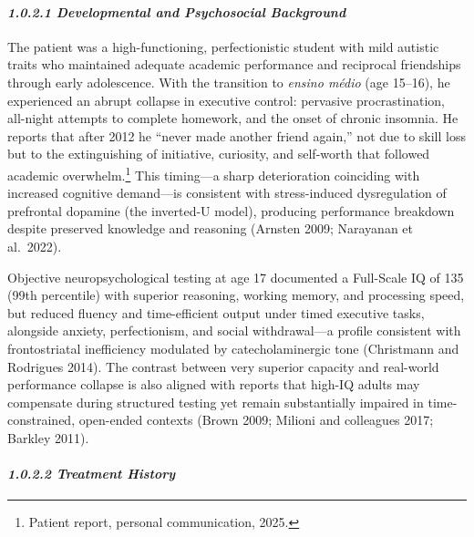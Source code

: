 \paragraph{\texorpdfstring{\emph{1.0.2.1 Developmental and Psychosocial Background}}{1.0.2.1 Developmental and Psychosocial Background}}\label{10b_traad-developmental-and-psychosocial-background}

The patient was a high-functioning, perfectionistic student with mild autistic traits who maintained adequate academic performance and reciprocal friendships through early adolescence. With the transition to \emph{ensino médio} (age 15--16), he experienced an abrupt collapse in executive control: pervasive procrastination, all-night attempts to complete homework, and the onset of chronic insomnia. He reports that after 2012 he ``never made another friend again,'' not due to skill loss but to the extinguishing of initiative, curiosity, and self-worth that followed academic overwhelm.\footnote{Patient report, personal communication, 2025.} This timing---a sharp deterioration coinciding with increased cognitive demand---is consistent with stress-induced dysregulation of prefrontal dopamine (the inverted-U model), producing performance breakdown despite preserved knowledge and reasoning (Arnsten 2009; Narayanan et al.~2022).

Objective neuropsychological testing at age 17 documented a Full-Scale IQ of 135 (99th percentile) with superior reasoning, working memory, and processing speed, but reduced fluency and time-efficient output under timed executive tasks, alongside anxiety, perfectionism, and social withdrawal---a profile consistent with frontostriatal inefficiency modulated by catecholaminergic tone (Christmann and Rodrigues 2014). The contrast between very superior capacity and real-world performance collapse is also aligned with reports that high-IQ adults may compensate during structured testing yet remain substantially impaired in time-constrained, open-ended contexts (Brown 2009; Milioni and colleagues 2017; Barkley 2011).

\paragraph{\texorpdfstring{\emph{1.0.2.2 Treatment History}}{1.0.2.2 Treatment History}}\label{10b_traad-treatment-history}

